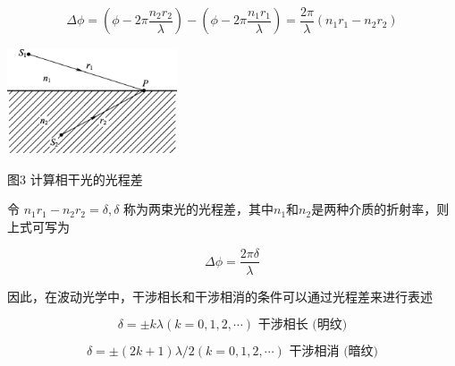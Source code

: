 \documentclass[
]{article}
\begin{document}
\[\Delta\phi = \left( \phi - 2\pi\frac{n_{2}r_{2}}{\lambda} \right) - \left( \phi - 2\pi\frac{n_{1}r_{1}}{\lambda} \right) = \frac{2\pi}{\lambda}\left( n_{1}r_{1} - n_{2}r_{2} \right)\]

\includegraphics[width=1.97922in,height=1.23623in]{vertopal_72c3f5a01d1e42e3b032effc6533cf2c/media/image3.png}

图3 计算相干光的光程差

令 \(n_{1}r_{1} - n_{2}r_{2} = \delta,\delta\)
称为两束光的光程差，其中\(n_{1}\)和\(n_{2}\)是两种介质的折射率，则上式可写为

\[\Delta\phi = \frac{2\pi\delta}{\lambda}\]

因此，在波动光学中，干涉相长和干涉相消的条件可以通过光程差来进行表述

\[\delta = \pm k\lambda(k = 0,1,2,\cdots)\text{~}\text{干涉相长}\text{\ (}\text{明纹}\text{)}\]

\[\delta = \pm (2k + 1)\lambda/2(k = 0,1,2,\cdots)\text{~}\text{干涉相消}\text{\ (}\text{暗纹}\text{)}\]
\end{document}
